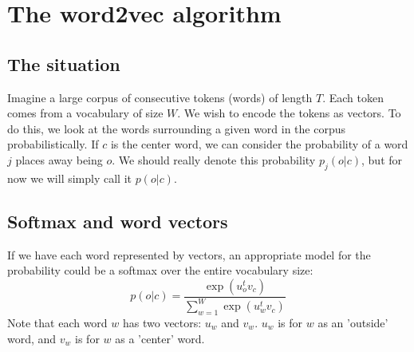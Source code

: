 \documentclass[12pt, a4paper]{article}
\numberwithin{equation}{section}
\begin{document}
\section{The word2vec algorithm}

\subsection{The situation}
Imagine a large corpus of consecutive tokens (words) of length $T$. Each token comes from a vocabulary of size $W$. We wish to encode the tokens as vectors. To do this, we look at the words surrounding a given word in the corpus probabilistically. If $c$ is the center word, we can consider the probability of a word $j$ places away being $o$. We should really denote this probability $p_j(o|c)$, but for now we will simply call it $p(o|c)$.

\subsection{Softmax and word vectors}
If we have each word represented by vectors, an appropriate model for the probability could be a softmax over the entire vocabulary size:
\begin{equation}
p(o|c)=\frac{\exp(u_o^t v_c)}{\sum_{w=1}^W\exp(u_w^t v_c)}
\end{equation}
Note that each word $w$ has two vectors: $u_w$ and $v_w$. $u_w$ is for $w$ as an 'outside' word, and $v_w$ is for $w$ as a 'center' word.
\end{document}
